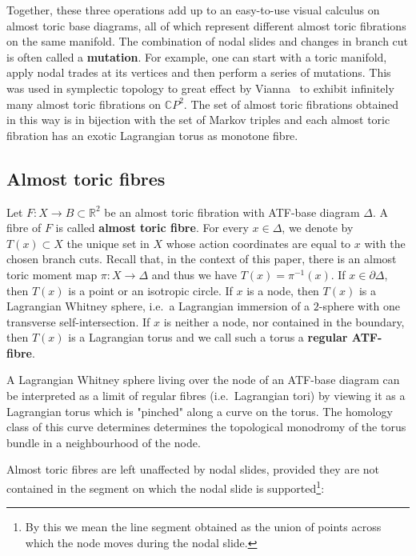 \documentclass[12pt,a4paper,draft]{scrartcl}
\begin{document}
Together, these three operations add up to an easy-to-use visual calculus on almost toric base diagrams, all of which represent different almost toric fibrations on the same manifold.
The combination of nodal slides and changes in branch cut is often called a \textbf{mutation}. For example, one can start with a toric manifold, apply nodal trades at its vertices and then perform a series of mutations.
This was used in symplectic topology to great effect by Vianna~\cite{Via16} to exhibit infinitely many almost toric fibrations on $\mathbb{C}P^2$. The set of almost toric fibrations obtained in this way is in bijection with the set of Markov triples and each almost toric fibration has an exotic Lagrangian torus as monotone fibre.

\subsection{Almost toric fibres}
\label{sec:atfibres}

Let $F \colon X \rightarrow B \subset \mathbb{R}^2$ be an almost toric fibration with ATF-base diagram $\Delta$. A fibre of $F$ is called \textbf{almost toric fibre}. For every $x \in \Delta$, we denote by $T(x) \subset X$ the unique set in $X$ whose action coordinates are equal to $x$ with the chosen branch cuts.
Recall that, in the context of this paper, there is an almost toric moment map $\pi \colon X \rightarrow \Delta$ and thus we have $T(x) = \pi^{-1}(x)$. If $x \in \partial \Delta$, then $T(x)$ is a point or an isotropic circle.
If $x$ is a node, then $T(x)$ is a Lagrangian Whitney sphere, i.e.\ a Lagrangian immersion of a $2$-sphere with one transverse self-intersection.
If $x$ is neither a node, nor contained in the boundary, then $T(x)$ is a Lagrangian torus and we call such a torus a \textbf{regular ATF-fibre}.

\begin{remark}
    \label{rk:pinchedtorus}
    A Lagrangian Whitney sphere living over the node of an ATF-base diagram can be interpreted as a limit of regular fibres (i.e.\ Lagrangian tori) by viewing it as a Lagrangian torus which is "pinched" along a curve on the torus.
The homology class of this curve determines determines the topological monodromy of the torus bundle in a neighbourhood of the node.
\end{remark}

Almost toric fibres are left unaffected by nodal slides, provided they are not contained in the segment on which the nodal slide is supported\footnote{By this we mean the line segment obtained as the union of points across which the node moves during the nodal slide.}:
\end{document}
